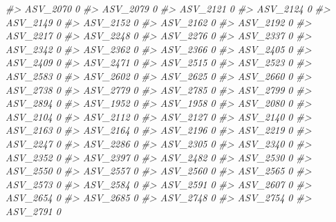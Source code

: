 \documentclass[
]{article}
\newenvironment{Shaded}{\begin{snugshade}}{\end{snugshade}}
\newcommand{\CommentTok}[1]{\textcolor[rgb]{0.56,0.35,0.01}{\textit{#1}}}
\begin{document}
\begin{Shaded}
\begin{Highlighting}[]
\CommentTok{\#\textgreater{} ASV\_2070  0}
\CommentTok{\#\textgreater{} ASV\_2079  0}
\CommentTok{\#\textgreater{} ASV\_2121  0}
\CommentTok{\#\textgreater{} ASV\_2124  0}
\CommentTok{\#\textgreater{} ASV\_2149  0}
\CommentTok{\#\textgreater{} ASV\_2152  0}
\CommentTok{\#\textgreater{} ASV\_2162  0}
\CommentTok{\#\textgreater{} ASV\_2192  0}
\CommentTok{\#\textgreater{} ASV\_2217  0}
\CommentTok{\#\textgreater{} ASV\_2248  0}
\CommentTok{\#\textgreater{} ASV\_2276  0}
\CommentTok{\#\textgreater{} ASV\_2337  0}
\CommentTok{\#\textgreater{} ASV\_2342  0}
\CommentTok{\#\textgreater{} ASV\_2362  0}
\CommentTok{\#\textgreater{} ASV\_2366  0}
\CommentTok{\#\textgreater{} ASV\_2405  0}
\CommentTok{\#\textgreater{} ASV\_2409  0}
\CommentTok{\#\textgreater{} ASV\_2471  0}
\CommentTok{\#\textgreater{} ASV\_2515  0}
\CommentTok{\#\textgreater{} ASV\_2523  0}
\CommentTok{\#\textgreater{} ASV\_2583  0}
\CommentTok{\#\textgreater{} ASV\_2602  0}
\CommentTok{\#\textgreater{} ASV\_2625  0}
\CommentTok{\#\textgreater{} ASV\_2660  0}
\CommentTok{\#\textgreater{} ASV\_2738  0}
\CommentTok{\#\textgreater{} ASV\_2779  0}
\CommentTok{\#\textgreater{} ASV\_2785  0}
\CommentTok{\#\textgreater{} ASV\_2799  0}
\CommentTok{\#\textgreater{} ASV\_2894  0}
\CommentTok{\#\textgreater{} ASV\_1952  0}
\CommentTok{\#\textgreater{} ASV\_1958  0}
\CommentTok{\#\textgreater{} ASV\_2080  0}
\CommentTok{\#\textgreater{} ASV\_2104  0}
\CommentTok{\#\textgreater{} ASV\_2112  0}
\CommentTok{\#\textgreater{} ASV\_2127  0}
\CommentTok{\#\textgreater{} ASV\_2140  0}
\CommentTok{\#\textgreater{} ASV\_2163  0}
\CommentTok{\#\textgreater{} ASV\_2164  0}
\CommentTok{\#\textgreater{} ASV\_2196  0}
\CommentTok{\#\textgreater{} ASV\_2219  0}
\CommentTok{\#\textgreater{} ASV\_2247  0}
\CommentTok{\#\textgreater{} ASV\_2286  0}
\CommentTok{\#\textgreater{} ASV\_2305  0}
\CommentTok{\#\textgreater{} ASV\_2340  0}
\CommentTok{\#\textgreater{} ASV\_2352  0}
\CommentTok{\#\textgreater{} ASV\_2397  0}
\CommentTok{\#\textgreater{} ASV\_2482  0}
\CommentTok{\#\textgreater{} ASV\_2530  0}
\CommentTok{\#\textgreater{} ASV\_2550  0}
\CommentTok{\#\textgreater{} ASV\_2557  0}
\CommentTok{\#\textgreater{} ASV\_2560  0}
\CommentTok{\#\textgreater{} ASV\_2565  0}
\CommentTok{\#\textgreater{} ASV\_2573  0}
\CommentTok{\#\textgreater{} ASV\_2584  0}
\CommentTok{\#\textgreater{} ASV\_2591  0}
\CommentTok{\#\textgreater{} ASV\_2607  0}
\CommentTok{\#\textgreater{} ASV\_2654  0}
\CommentTok{\#\textgreater{} ASV\_2685  0}
\CommentTok{\#\textgreater{} ASV\_2748  0}
\CommentTok{\#\textgreater{} ASV\_2754  0}
\CommentTok{\#\textgreater{} ASV\_2791  0}

\end{Highlighting}
\end{Shaded}
\end{document}
